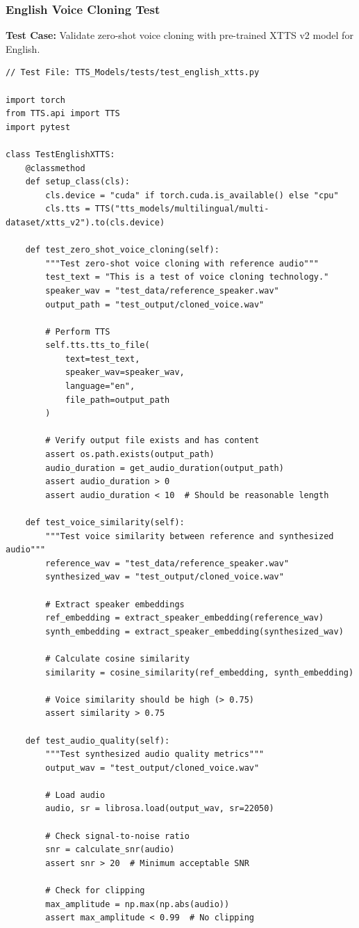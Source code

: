 \subsubsection{English Voice Cloning Test}

\textbf{Test Case:} Validate zero-shot voice cloning with pre-trained XTTS v2 model for English.

\begin{verbatim}
// Test File: TTS_Models/tests/test_english_xtts.py

import torch
from TTS.api import TTS
import pytest

class TestEnglishXTTS:
    @classmethod
    def setup_class(cls):
        cls.device = "cuda" if torch.cuda.is_available() else "cpu"
        cls.tts = TTS("tts_models/multilingual/multi-dataset/xtts_v2").to(cls.device)
    
    def test_zero_shot_voice_cloning(self):
        """Test zero-shot voice cloning with reference audio"""
        test_text = "This is a test of voice cloning technology."
        speaker_wav = "test_data/reference_speaker.wav"
        output_path = "test_output/cloned_voice.wav"
        
        # Perform TTS
        self.tts.tts_to_file(
            text=test_text,
            speaker_wav=speaker_wav,
            language="en",
            file_path=output_path
        )
        
        # Verify output file exists and has content
        assert os.path.exists(output_path)
        audio_duration = get_audio_duration(output_path)
        assert audio_duration > 0
        assert audio_duration < 10  # Should be reasonable length
    
    def test_voice_similarity(self):
        """Test voice similarity between reference and synthesized audio"""
        reference_wav = "test_data/reference_speaker.wav"
        synthesized_wav = "test_output/cloned_voice.wav"
        
        # Extract speaker embeddings
        ref_embedding = extract_speaker_embedding(reference_wav)
        synth_embedding = extract_speaker_embedding(synthesized_wav)
        
        # Calculate cosine similarity
        similarity = cosine_similarity(ref_embedding, synth_embedding)
        
        # Voice similarity should be high (> 0.75)
        assert similarity > 0.75
    
    def test_audio_quality(self):
        """Test synthesized audio quality metrics"""
        output_wav = "test_output/cloned_voice.wav"
        
        # Load audio
        audio, sr = librosa.load(output_wav, sr=22050)
        
        # Check signal-to-noise ratio
        snr = calculate_snr(audio)
        assert snr > 20  # Minimum acceptable SNR
        
        # Check for clipping
        max_amplitude = np.max(np.abs(audio))
        assert max_amplitude < 0.99  # No clipping
\end{verbatim}

